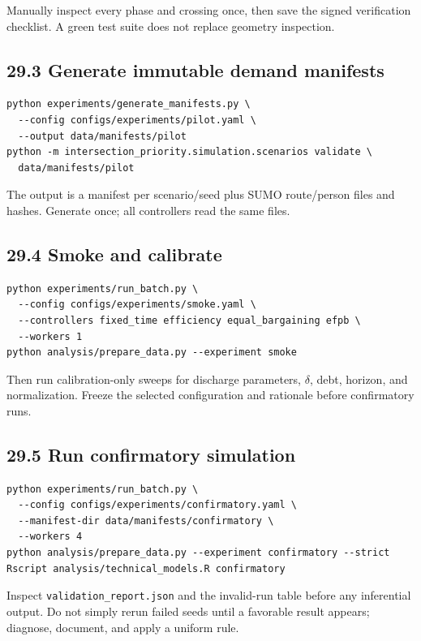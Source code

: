 \documentclass[
  english,
  11pt,
  a4paper,
]{article}
\begin{document}
Manually inspect every phase and crossing once, then save the signed
verification checklist. A green test suite does not replace geometry
inspection.

\subsection{29.3 Generate immutable demand
manifests}\label{generate-immutable-demand-manifests}

\begin{verbatim}
python experiments/generate_manifests.py \
  --config configs/experiments/pilot.yaml \
  --output data/manifests/pilot
python -m intersection_priority.simulation.scenarios validate \
  data/manifests/pilot
\end{verbatim}

The output is a manifest per scenario/seed plus SUMO route/person files
and hashes. Generate once; all controllers read the same files.

\subsection{29.4 Smoke and calibrate}\label{smoke-and-calibrate}

\begin{verbatim}
python experiments/run_batch.py \
  --config configs/experiments/smoke.yaml \
  --controllers fixed_time efficiency equal_bargaining efpb \
  --workers 1
python analysis/prepare_data.py --experiment smoke
\end{verbatim}

Then run calibration-only sweeps for discharge parameters, \(\delta\), debt,
horizon, and normalization. Freeze the selected configuration and
rationale before confirmatory runs.

\subsection{29.5 Run confirmatory
simulation}\label{run-confirmatory-simulation}

\begin{verbatim}
python experiments/run_batch.py \
  --config configs/experiments/confirmatory.yaml \
  --manifest-dir data/manifests/confirmatory \
  --workers 4
python analysis/prepare_data.py --experiment confirmatory --strict
Rscript analysis/technical_models.R confirmatory
\end{verbatim}

Inspect \texttt{validation\_report.json} and the invalid-run table
before any inferential output. Do not simply rerun failed seeds until a
favorable result appears; diagnose, document, and apply a uniform rule.
\end{document}
